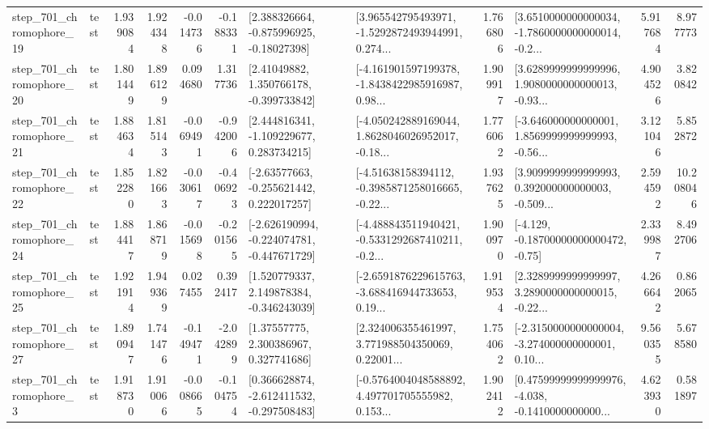 \begin{tabular}{llrrrrllrlrr}
  step\_701\_chromophore\_19 &      test &      1.939084 &    1.924348 &     -0.014736 & -0.188331 &    [2.388326664, -0.875996925, -0.18027398] &  [3.965542795493971, -1.5292872493944991, 0.274... &       1.766806 &  [3.6510000000000034, -1.7860000000000014, -0.2... &            5.917684 &          8.977773 \\
  step\_701\_chromophore\_20 &      test &      1.801449 &    1.896129 &      0.094680 &  1.317736 &     [2.41049882, 1.350766178, -0.399733842] &  [-4.161901597199378, -1.8438422985916987, 0.98... &       1.909917 &  [3.6289999999999996, 1.9080000000000013, -0.93... &            4.904526 &          3.820842 \\
  step\_701\_chromophore\_21 &      test &      1.884634 &    1.815143 &     -0.069491 & -0.942006 &    [2.444816341, -1.109229677, 0.283734215] &  [-4.050242889169044, 1.8628046026952017, -0.18... &       1.776062 &  [-3.646000000000001, 1.8569999999999993, -0.56... &            3.121046 &          5.852872 \\
  step\_701\_chromophore\_22 &      test &      1.852280 &    1.821663 &     -0.030617 & -0.406923 &    [-2.63577663, -0.255621442, 0.222017257] &  [-4.51638158394112, -0.3985871258016665, -0.22... &       1.937625 &  [3.9099999999999993, 0.392000000000003, -0.509... &            2.594592 &         10.208046 \\
  step\_701\_chromophore\_24 &      test &      1.884417 &    1.868719 &     -0.015698 & -0.201565 &  [-2.626190994, -0.224074781, -0.447671729] &  [-4.488843511940421, -0.5331292687410211, -0.2... &       1.900970 &              [-4.129, -0.18700000000000472, -0.75] &            2.339987 &          8.492706 \\
  step\_701\_chromophore\_25 &      test &      1.921914 &    1.949369 &      0.027455 &  0.392417 &    [1.520779337, 2.149878384, -0.346243039] &  [-2.6591876229615763, -3.688416944733653, 0.19... &       1.919534 &  [2.3289999999999997, 3.2890000000000015, -0.22... &            4.266642 &          0.862065 \\
  step\_701\_chromophore\_27 &      test &      1.890947 &    1.741476 &     -0.149471 & -2.042899 &      [1.37557775, 2.300386967, 0.327741686] &  [2.324006355461997, 3.771988504350069, 0.22001... &       1.754062 &  [-2.3150000000000004, -3.274000000000001, 0.10... &            9.560355 &          5.678580 \\
   step\_701\_chromophore\_3 &      test &      1.918730 &    1.910066 &     -0.008665 & -0.104754 &   [0.366628874, -2.612411532, -0.297508483] &  [-0.5764004048588892, 4.497701705555982, 0.153... &       1.902412 &  [0.47599999999999976, -4.038, -0.1410000000000... &            4.623930 &          0.581897 \\

\end{tabular}
